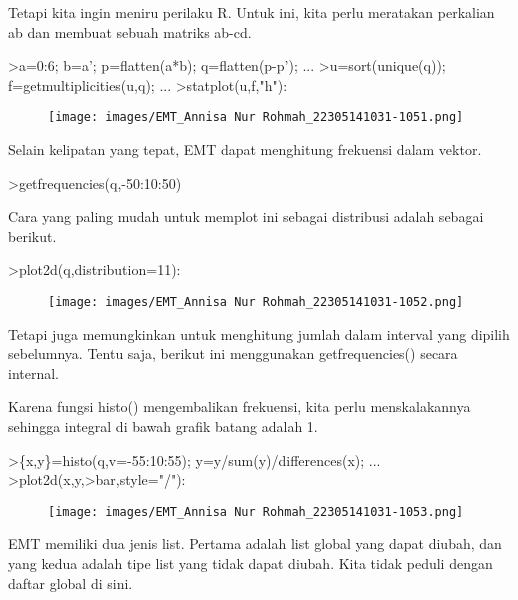 \documentclass[a4paper,10pt]{article}
\begin{document}
\begin{eulernotebook}
\begin{eulercomment}
\begin{eulercomment}
\begin{eulercomment}
\begin{eulercomment}
\begin{eulercomment}
Tetapi kita ingin meniru perilaku R. Untuk ini, kita perlu meratakan
perkalian ab dan membuat sebuah matriks ab-cd.
\end{eulercomment}
\begin{eulerprompt}
>a=0:6; b=a'; p=flatten(a*b); q=flatten(p-p'); ...
>u=sort(unique(q)); f=getmultiplicities(u,q); ...
>statplot(u,f,"h"):
\end{eulerprompt}
\begin{figure}[h]
    \centering
    \texttt{[image: images/EMT\_Annisa Nur Rohmah\_22305141031-1051.png]}
\end{figure}
\begin{eulercomment}
Selain kelipatan yang tepat, EMT dapat menghitung frekuensi dalam
vektor.
\end{eulercomment}
\begin{eulerprompt}
>getfrequencies(q,-50:10:50)
\end{eulerprompt}
\begin{euleroutput}
  [0,  23,  132,  316,  602,  801,  333,  141,  53,  0]
\end{euleroutput}
\begin{eulercomment}
Cara yang paling mudah untuk memplot ini sebagai distribusi adalah
sebagai berikut.
\end{eulercomment}
\begin{eulerprompt}
>plot2d(q,distribution=11):
\end{eulerprompt}
\begin{figure}[h]
    \centering
    \texttt{[image: images/EMT\_Annisa Nur Rohmah\_22305141031-1052.png]}
\end{figure}
\begin{eulercomment}
Tetapi juga memungkinkan untuk menghitung jumlah dalam interval yang
dipilih sebelumnya. Tentu saja, berikut ini menggunakan
getfrequencies() secara internal.

Karena fungsi histo() mengembalikan frekuensi, kita perlu
menskalakannya sehingga integral di bawah grafik batang adalah 1.
\end{eulercomment}
\begin{eulerprompt}
>\{x,y\}=histo(q,v=-55:10:55); y=y/sum(y)/differences(x); ...
>plot2d(x,y,>bar,style="/"):
\end{eulerprompt}
\begin{figure}[h]
    \centering
    \texttt{[image: images/EMT\_Annisa Nur Rohmah\_22305141031-1053.png]}
\end{figure}
\begin{eulercomment}
EMT memiliki dua jenis list. Pertama adalah list global yang dapat
diubah, dan yang kedua adalah tipe list yang tidak dapat diubah. Kita
tidak peduli dengan daftar global di sini.


\end{eulercomment}
\end{eulercomment}
\end{eulercomment}
\end{eulercomment}
\end{eulercomment}
\end{eulernotebook}
\end{document}
